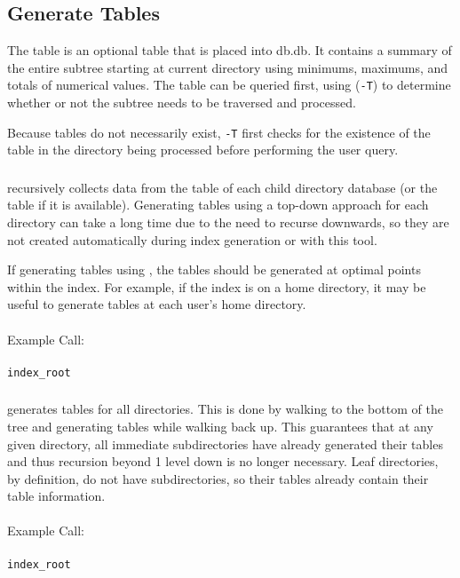\subsection{Generate \treesummary Tables}
\label{sec:treesummary}
The \treesummary table is an optional table that is placed into
db.db. It contains a summary of the entire subtree starting at current
directory using minimums, maximums, and totals of numerical values.
The \treesummary table can be queried first, using (\texttt{-T}) to
determine whether or not the subtree needs to be traversed and processed.

Because \treesummary tables do not necessarily exist, \gufiquery
\texttt{-T} first checks for the existence of the \treesummary table
in the directory being processed before performing the user query.

\subsubsection{\gufitreesummary}
\gufitreesummary recursively collects data from the \summary table of
each child directory database (or the \treesummary table if it is
available). Generating \treesummary tables using a top-down approach
for each directory can take a long time due to the need to recurse
downwards, so they are not created automatically during index
generation or with this tool.

If generating \treesummary tables using \gufitreesummary, the tables
should be generated at optimal points within the index. For example,
if the index is on a home directory, it may be useful to generate
\treesummary tables at each user's home directory.
\\\\
Example Call:
\\\\
\indent \gufitreesummary \texttt{index\_root}

\subsubsection{\gufitreesummaryall}
\gufitreesummaryall generates \treesummary tables for all
directories. This is done by walking to the bottom of the tree and
generating \treesummary tables while walking back up. This guarantees
that at any given directory, all immediate subdirectories have already
generated their \treesummary tables and thus recursion beyond 1 level
down is no longer necessary. Leaf directories, by definition, do not
have subdirectories, so their \summary tables already contain their
\treesummary table information.
\\\\
Example Call:
\\\\
\indent \gufitreesummaryall \texttt{index\_root}


